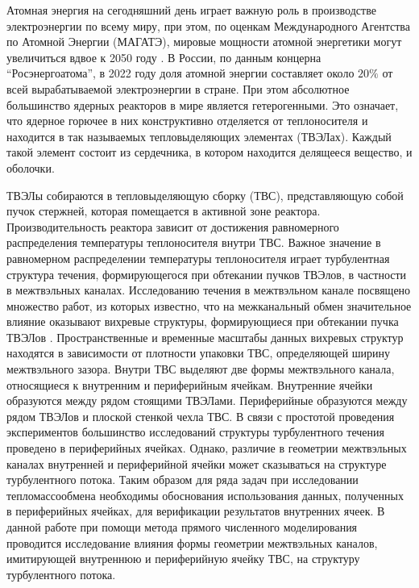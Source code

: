 
%
Атомная энергия на сегодняшний день играет важную роль в производстве электроэнергии по всему миру, 
при этом, по оценкам Международного Агентства по Атомной Энергии (МАГАТЭ), 
мировые мощности атомной энергетики могут увеличиться вдвое к 2050 году \cite{gritsevskyi2016outlook}.
%
В России, по данным концерна ``Росэнергоатома'', в 2022 году доля атомной энергии составляет около 
$20\%$ от всей вырабатываемой электроэнергии в стране. 
%
При этом абсолютное большинство ядерных реакторов в мире является гетерогенными.
%
Это означает, что ядерное горючее в них конструктивно отделяется от теплоносителя и 
находится в так называемых тепловыделяющих элементах (ТВЭЛах).
%
Каждый такой элемент состоит из сердечника, в котором находится делящееся вещество, и оболочки.
% 


ТВЭЛы собираются в тепловыделяющую сборку (ТВС), представляющую собой пучок стержней, 
которая помещается в активной зоне реактора. 
%
Производительность реактора зависит от достижения равномерного распределения температуры теплоносителя внутри ТВС. 
%
Важное значение в равномерном распределении температуры теплоносителя играет турбулентная структура течения, 
формирующегося при обтекании пучков ТВЭлов, в частности в межтвэльных каналах. 
%
Исследованию течения в межтвэльном канале посвящено множество работ, из которых известно, 
что на межканальный обмен значительное влияние оказывают вихревые структуры, 
формирующиеся при обтекании пучка ТВЭЛов \cite{meyer2010discovery}. 
%
Пространственные и временные масштабы данных вихревых структур находятся 
в зависимости от плотности упаковки ТВС, определяющей ширину межтвэльного зазора.
%
Внутри ТВС выделяют две формы межтвэльного канала, относящиеся 
к внутренним и периферийным ячейкам. 
%
Внутренние ячейки образуются между рядом стоящими ТВЭЛами.
%
Периферийные образуются между рядом ТВЭЛов и плоской стенкой чехла ТВС. 
%
В связи с простотой проведения экспериментов большинство исследований структуры 
турбулентного течения проведено в периферийных ячейках.
%
Однако, различие в геометрии межтвэльных каналах внутренней и периферийной ячейки 
может сказываться на структуре турбулентного потока.
%
Таким образом для ряда задач при исследовании тепломассообмена необходимы 
обоснования использования данных, полученных в периферийных ячейках, для верификации результатов внутренних ячеек.
%
В данной работе при помощи метода прямого численного моделирования 
проводится исследование влияния формы геометрии межтвэльных каналов, 
имитирующей внутреннюю и периферийную ячейку ТВС, на структуру турбулентного потока. 

